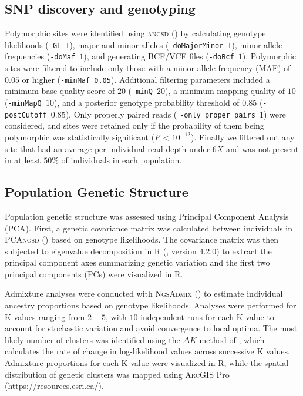 \documentclass[9pt,a4paper,twoside]{rho-class/rho}
\begin{document}
    \subsection{SNP discovery and genotyping}

        Polymorphic sites were identified using \textsc{angsd}  (\cite{Korneliussen2014}) by calculating genotype likelihoods (\texttt{-GL $1$}), major and minor alleles (\texttt{-doMajorMinor $1$}), minor allele frequencies (\texttt{-doMaf $1$}), and generating \textsc{BCF/VCF} files (\texttt{-doBcf $1$}). Polymorphic sites were filtered to include only those with a minor allele frequency (MAF) of $0.05$ or higher (\texttt{-minMaf 0.05}). Additional filtering parameters included a minimum base quality score of $20$ (\texttt{-minQ $20$}), a minimum mapping quality of $10$ (\texttt{-minMapQ $10$}), and a posterior genotype probability threshold of $0.85$ (\texttt{-postCutoff $0.85$}). Only properly paired reads ( \texttt{-only\_proper\_pairs $1$}) were considered, and sites were retained only if the probability of them being polymorphic was statistically significant (\textit{P} < $10^{-12}$). Finally we filtered out any site that had an average per individual read depth under $6X$ and was not present in at least $50\%$ of individuals in each population.

    \subsection{Population Genetic Structure}

        Population genetic structure was assessed using Principal Component Analysis (PCA). First, a genetic covariance matrix was calculated between individuals in \textsc{PCAngsd} (\cite{Meisner2018}) based on genotype likelihoods. The covariance matrix was then subjected to eigenvalue decomposition in R (\cite{R2024}, version 4.2.0) to extract the principal component axes summarizing genetic variation and the first two principal components (PCs) were visualized in R.
       
        Admixture analyses were conducted with \textsc{NgsAdmix} (\cite{Skotte2013}) to estimate individual ancestry proportions based on genotype likelihoods. Analyses were performed for K values ranging from $2-5$, with $10$ independent runs for each K value to account for stochastic variation and avoid convergence to local optima. The most likely number of clusters was identified using the $\Delta{K}$ method of \cite{Evanno2005}, which calculates the rate of change in log-likelihood values across successive K values. Admixture proportions for each K value were visualized in R, while the spatial distribution of genetic clusters was mapped using \textsc{ArcGIS} Pro (https://resources.esri.ca/).
\end{document}
